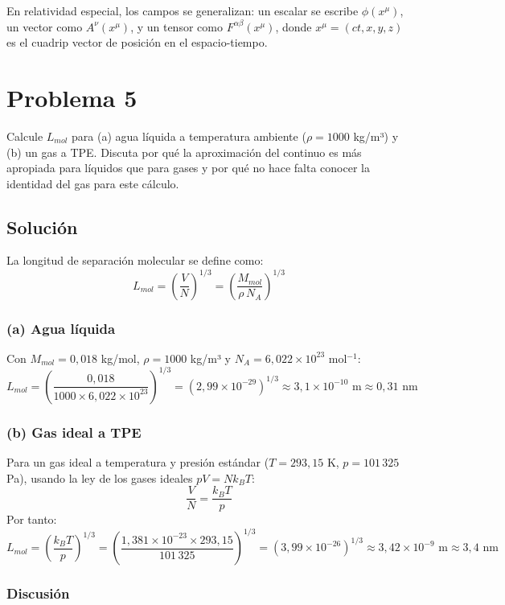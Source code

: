 \documentclass[a4paper]{article}
\begin{document}
En relatividad especial, los campos se generalizan: un escalar se escribe $\phi(x^\mu)$, un vector como $A^\nu(x^\mu)$, y un tensor como $F^{\alpha\beta}(x^\mu)$, donde $x^\mu = (ct, x, y, z)$ es el cuadrip vector de posición en el espacio-tiempo.

\section{Problema 5}
Calcule $L_{mol}$ para (a) agua líquida a temperatura ambiente ($\rho = 1000$ kg/m³) y (b) un gas a TPE. Discuta por qué la aproximación del continuo es más apropiada para líquidos que para gases y por qué no hace falta conocer la identidad del gas para este cálculo.

\subsection{Solución}

La longitud de separación molecular se define como:
$$
L_{mol} = \left(\frac{V}{N}\right)^{1/3} = \left(\frac{M_{mol}}{\rho\, N_A}\right)^{1/3}
$$

\subsubsection{(a) Agua líquida}

Con $M_{mol} = 0{,}018$ kg/mol, $\rho = 1000$ kg/m³ y $N_A = 6{,}022 \times 10^{23}$ mol$^{-1}$:
$$
L_{mol} = \left(\frac{0{,}018}{1000 \times 6{,}022 \times 10^{23}}\right)^{1/3} = \left(2{,}99 \times 10^{-29}\right)^{1/3} \approx 3{,}1 \times 10^{-10} \text{ m} \approx 0{,}31 \text{ nm}
$$

\subsubsection{(b) Gas ideal a TPE}

Para un gas ideal a temperatura y presión estándar ($T = 293{,}15$ K, $p = 101\,325$ Pa), usando la ley de los gases ideales $pV = Nk_B T$:
$$
\frac{V}{N} = \frac{k_B T}{p}
$$
Por tanto:
$$
L_{mol} = \left(\frac{k_B T}{p}\right)^{1/3} = \left(\frac{1{,}381 \times 10^{-23} \times 293{,}15}{101\,325}\right)^{1/3} = \left(3{,}99 \times 10^{-26}\right)^{1/3} \approx 3{,}42 \times 10^{-9} \text{ m} \approx 3{,}4 \text{ nm}
$$

\subsubsection{Discusión}
\end{document}
